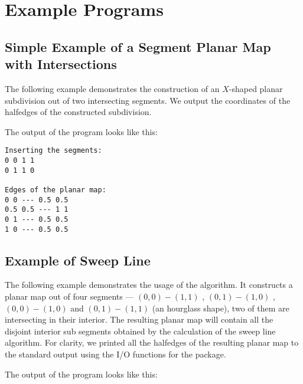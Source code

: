 
\section{Example Programs}
\subsection{Simple Example of a Segment Planar Map with Intersections}
\label{ssec:example1}
The following example demonstrates the construction of an
$X$-shaped planar subdivision out of two intersecting segments.
We output the coordinates of the halfedges of the constructed
subdivision.


The output of the program looks like this:
\begin{verbatim}
Inserting the segments:
0 0 1 1
0 1 1 0

Edges of the planar map:
0 0 --- 0.5 0.5
0.5 0.5 --- 1 1
0 1 --- 0.5 0.5
1 0 --- 0.5 0.5
\end{verbatim}


\subsection{Example of Sweep Line}
\label{ssec:example1_sweep}
  The following example demonstrates the usage of the  algorithm.  It constructs a planar map out of four segments
  --- $(0,0)-(1,1)$ , $(0,1)-(1,0)$ , $(0,0)-(1,0)$ and $(0,1)-(1,1)$
  (an hourglass shape), two of them are intersecting in their
  interior.  The resulting planar map will contain all the disjoint
  interior sub segments obtained by the calculation of the sweep
  line algorithm. For clarity, we printed all the halfedges of the
  resulting planar map to the standard output using the I/O functions
  for the  package.


The output of the program looks like this:




